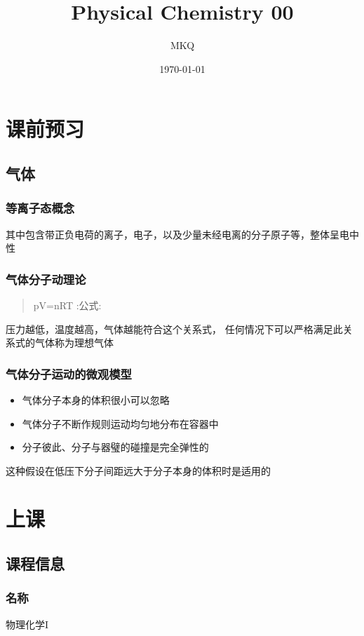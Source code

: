 \documentclass[11pt]{article}
\author{MKQ}
\date{\today}
\title{Physical Chemistry 00}
\begin{document}
\maketitle
\tableofcontents

\section{课前\hfill{}\textsc{预习}}
\label{sec:org9f86bbe}
\subsection{气体}
\label{sec:orgf6bfc1c}
\subsubsection{等离子态\hfill{}\textsc{概念}}
\label{sec:org6a9dd88}
其中包含带正负电荷的离子，电子，以及少量未经电离的分子原子等，整体呈电中性
\subsubsection{气体分子动理论}
\label{sec:org368b6d2}
\begin{quote}
pV=nRT :公式:
\end{quote}
压力越低，温度越高，气体越能符合这个关系式，
任何情况下可以严格满足此关系式的气体称为理想气体

\subsubsection{气体分子运动的微观模型}
\label{sec:org0c4e01a}
\begin{itemize}
\item 气体分子本身的体积很小可以忽略
\item 气体分子不断作规则运动均匀地分布在容器中
\item 分子彼此、分子与器璧的碰撞是完全弹性的
\end{itemize}
这种假设在低压下分子间距远大于分子本身的体积时是适用的

\section{上课}
\label{sec:orgbffe346}
\subsection{课程信息}
\label{sec:org105a27d}
\subsubsection{名称}
\label{sec:org1e1fd33}
物理化学I
\end{document}
